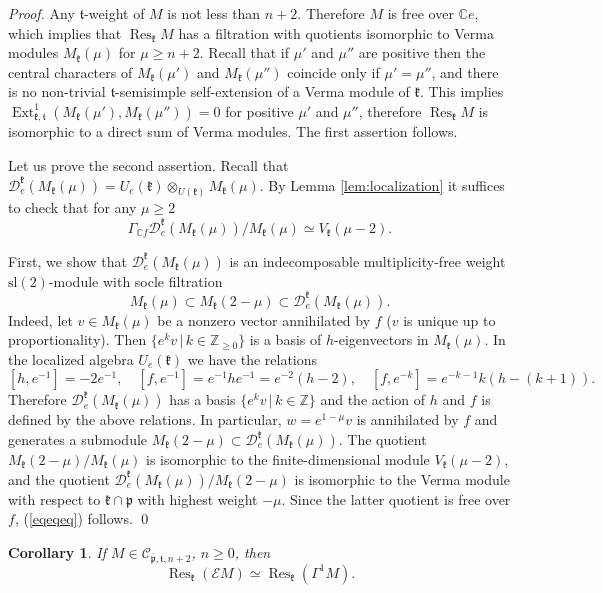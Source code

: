 \documentclass{tglat2e}
\newtheorem{corollary}[theorem]{Corollary}
\theoremstyle{definition}
\theoremstyle{remark}
\renewcommand{\tt}{\mathfrak{t}}
\newcommand{\kk}{\mathfrak{k}}
\newcommand{\pp}{\mathfrak{p}}
\DeclareMathOperator{\Res}{Res}
\begin{document}
\begin{proof} Any $\mathfrak{t}$-weight of $M$ is not less than
  $n+2$. Therefore $M$ is free over $\mathbb C e$, which implies that
  $\Res_{\kk} M$ has a filtration with quotients isomorphic to
  Verma modules
  $M_\kk(\mu)$ for $\mu\geq n+2$. Recall that if  $\mu'$ and $\mu''$ are positive then the central characters of $M_\kk(\mu')$ and $M_\kk(\mu'')$ coincide only if
$\mu'=\mu''$, and there is no non-trivial $\tt$-semisimple self-extension of a Verma module of $\kk$. This implies
  $\operatorname{Ext}^1_{\kk,\tt}(M_\kk(\mu'),M_\kk(\mu''))=0$ for
  positive $\mu'$ and $\mu''$, therefore $\Res_{\kk} M$ is
  isomorphic to a
  direct sum of Verma modules. The first assertion follows.

Let us prove the second assertion.  Recall that $\mathcal{D}^{\kk}_e\left(M_\kk(\mu)\right)=U_e(\kk)\otimes_{U(\kk)}M_\kk(\mu)$. By Lemma \ref{lem:localization}
it suffices to check that for any $\mu\geq 2$
\begin{equation}\label{eqeqeq}
\Gamma_{\mathbb C f}\mathcal D^\kk_e\left(M_\kk(\mu)\right)/M_\kk(\mu)\simeq V_\kk(\mu-2).
\end{equation}
 
First, we show that $\mathcal D^\kk_e(M_\kk(\mu))$ is an indecomposable multiplicity-free weight
$\mathrm{sl}(2)$-module with socle filtration $$M_\kk(\mu)\subset M_\kk(2-\mu)\subset \mathcal D^\kk_e(M_\kk(\mu)).$$ 
Indeed, let $v\in M_\kk(\mu)$ be a nonzero vector annihilated by $f$ ($v$ is unique up to proportionality).
Then $\{e^k v\,|\,k\in\mathbb Z_{\geq 0}\}$ is a basis of $h$-eigenvectors in $ M_\kk(\mu)$. In the localized algebra $U_e(\kk)$
we have the relations
$$[h,e^{-1}]=-2e^{-1},\quad [f,e^{-1}]=e^{-1}he^{-1}=e^{-2}(h-2), \quad [f,e^{-k}]=e^{-k-1}k(h-(k+1)).$$
Therefore $\mathcal D^\kk_e(M_\kk(\mu))$ has a basis  $\{e^k v\,|\,k\in\mathbb Z\}$ and the action of $h$ and $f$ is defined by the above relations.
In particular, $w=e^{1-\mu}v$ is annihilated by $f$ and generates a submodule $ M_\kk(2-\mu)\subset \mathcal D^\kk_e(M_\kk(\mu))$. The quotient
$ M_\kk(2-\mu)/ M_\kk(\mu)$ is isomorphic to the finite-dimensional module $V_\kk(\mu-2)$, and 
the quotient $ \mathcal D^\kk_e(M_\kk(\mu))/ M_\kk(2-\mu)$ is isomorphic to the Verma module with respect to $\kk\cap\pp$ with highest weight 
$-\mu$. Since the latter quotient is free over $f$, (\ref{eqeqeq}) follows.
\qed\end{proof}

\begin{corollary}\label{cor:restriction}  If $M\in \mathcal{C}_{\bar{\pp},\tt,n+2}$, $n\geq 0$, then
$$\Res_\kk(\mathcal EM)\simeq\Res_\kk\left(\Gamma^1M\right).$$
\end{corollary}
\end{document}
